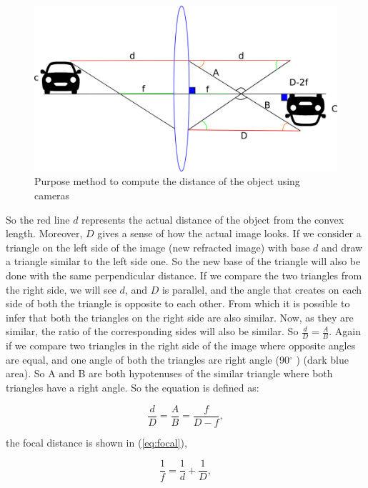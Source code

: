 \begin{figure}[H]
\centering
\includegraphics[width=\textwidth]{imagens/desenhando.png}
\caption{Purpose method to compute the distance of the object using cameras}
\label{fig:distance}
\end{figure}


So the red line $d$ represents the actual distance of the object from the convex length. Moreover, $D$ gives a sense of how the actual image looks. If we consider a triangle on the left side of the image (new refracted image) with base $d$ and draw a triangle similar to the left side one. So the new base of the triangle will also be done with the same perpendicular distance. If we compare the two triangles from the right side, we will see $d$, and $D$ is parallel, and the angle that creates on each side of both the triangle is opposite to each other. From which it is possible to infer that both the triangles on the right side are also similar. Now, as they are similar, the ratio of the corresponding sides will also be similar. So $\frac{d}{D} = \frac{A}{B}$. Again if we compare two triangles in the right side of the image where opposite angles are equal, and one angle of both the triangles are right angle (90$^{\circ}$ ) (dark blue area). So A and B are both hypotenuses of the similar triangle where both triangles have a right angle. So the equation is defined as:

    \begin{equation}\label{eq:meausure}
        \frac{d}{D} = \frac{A}{B} = \frac{f}{D-f},
    \end{equation}

 the focal distance is shown in (\ref{eq:focal}), 

\begin{equation}\label{eq:focal}
    \frac{1}{f} = \frac{1}{d} + \frac{1}{D},
\end{equation}

